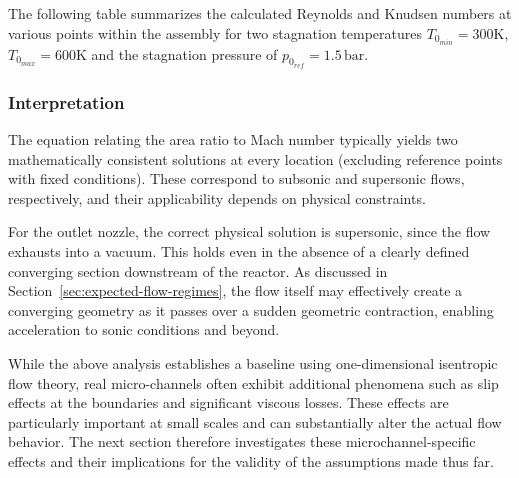	The following table summarizes the calculated Reynolds and Knudsen numbers at various points within the assembly for two stagnation temperatures $T_{0_{min}} = 300 \text{K}$, $T_{0_{max}} = 600 \text{K}$ and the stagnation pressure of $p_{0_{ref}} = 1.5\,\text{bar}$.

	

	\newpage

\subsubsection*{Interpretation}

	The equation relating the area ratio to Mach number typically yields two mathematically consistent solutions at every location (excluding reference points with fixed conditions).
	These correspond to subsonic and supersonic flows, respectively, and their applicability depends on physical constraints.

	For the outlet nozzle, the correct physical solution is supersonic, since the flow exhausts into a vacuum.
	This holds even in the absence of a clearly defined converging section downstream of the reactor.
	As discussed in Section~\ref{sec:expected-flow-regimes}, the flow itself may effectively create a converging geometry as it passes over a sudden geometric contraction, enabling acceleration to sonic conditions and beyond.

	While the above analysis establishes a baseline using one-dimensional isentropic flow theory, real micro-channels often exhibit additional phenomena such as slip effects at the boundaries and significant viscous losses.
	These effects are particularly important at small scales and can substantially alter the actual flow behavior.
	The next section therefore investigates these microchannel-specific effects and their implications for the validity of the assumptions made thus far.
